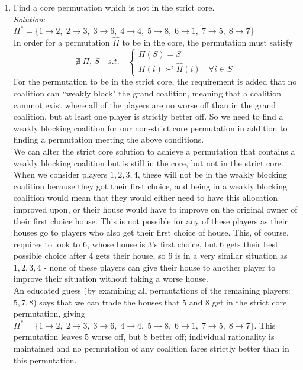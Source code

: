 \documentclass{article}
\begin{document}
\begin{enumerate}
\begin{enumerate}
  \item Find a core permutation which is not in the strict core. \\

  \textit{Solution}: \\
  
  $\Pi^{*} = \{ 1 \rightarrow 2,\; 2 \rightarrow 3,\; 3 \rightarrow 6,\; 4 \rightarrow 4,\; 5 \rightarrow 8,\; 6 \rightarrow 1,\; 7 \rightarrow 5,\; 8 \rightarrow 7 \}$ \\
  
  In order for a permutation $\hat{\Pi}$ to be in the core, the permutation must satisfy
  \[ \nexists \; \Pi,\, S \quad s.t. \quad \begin{cases} \Pi(S) = S \\
                             \Pi(i) \succ^{i} \hat{\Pi}(i) \quad \forall i \in S
     \end{cases} \]
  For the permutation to be in the strict core, the requirement is added that no coalition can ``weakly block" the grand coalition, meaning that a coalition cannnot exist where all of the players are no worse off than in the grand coalition, but at least one player is strictly better off. So we need to find a weakly blocking coalition for our non-strict core permutation in addition to finding a permutation meeting the above conditions. \\

  We can alter the strict core solution to achieve a permutation that contains a weakly blocking coalition but is still in the core, but not in the strict core. \\

  When we consider players $1, 2, 3, 4$, these will not be in the weakly blocking coalition because they got their first choice, and being in a weakly blocking coalition would mean that they would either need to have this allocation improved upon, or their house would have to improve on the original owner of their first choice house. This is not possible for any of these players as their houses go to players who also get their first choice of house. This, of course, requires to look to $6$, whose house is $3$'s first choice, but $6$ gets their best possible choice after $4$ gets their house, so $6$ is in a very similar situation as $1, 2, 3, 4$ - none of these players can give their house to another player to improve their situation without taking a worse house. \\

   An educated guess (by examining all permutations of the remaining players: $5, 7, 8$) says that we can trade the houses that $5$ and $8$ get in the strict core permutation, giving $\Pi^{*} = \{ 1 \rightarrow 2,\; 2 \rightarrow 3,\; 3 \rightarrow 6,\; 4 \rightarrow 4,\; 5 \rightarrow 8,\; 6 \rightarrow 1,\; 7 \rightarrow 5,\; 8 \rightarrow 7 \}$. This permutation leaves $5$ worse off, but $8$ better off; individual rationality is maintained and no permutation of any coalition fares strictly better than in this permutation. \\


\end{enumerate}
\end{enumerate}
\end{document}
